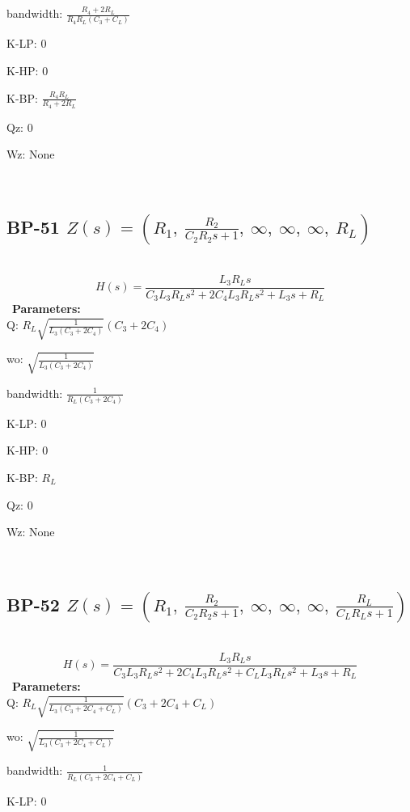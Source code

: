 \documentclass{article}
\begin{document}
bandwidth: $\frac{R_{4} + 2 R_{L}}{R_{4} R_{L} \left(C_{3} + C_{L}\right)}$\ 

K-LP: $0$\ 

K-HP: $0$\ 

K-BP: $\frac{R_{4} R_{L}}{R_{4} + 2 R_{L}}$\ 

Qz: $0$\ 

Wz: $\text{None}$\ 

\ 

\subsection{BP-51 $Z(s) = \left( R_{1}, \  \frac{R_{2}}{C_{2} R_{2} s + 1}, \  \infty, \  \infty, \  \infty, \  R_{L}\right)$ } \ 
\textbf{\[H(s) = \frac{L_{3} R_{L} s}{C_{3} L_{3} R_{L} s^{2} + 2 C_{4} L_{3} R_{L} s^{2} + L_{3} s + R_{L}}\] } \ 
\textbf{Parameters:}\\ 

Q: $R_{L} \sqrt{\frac{1}{L_{3} \left(C_{3} + 2 C_{4}\right)}} \left(C_{3} + 2 C_{4}\right)$\ 

wo: $\sqrt{\frac{1}{L_{3} \left(C_{3} + 2 C_{4}\right)}}$\ 

bandwidth: $\frac{1}{R_{L} \left(C_{3} + 2 C_{4}\right)}$\ 

K-LP: $0$\ 

K-HP: $0$\ 

K-BP: $R_{L}$\ 

Qz: $0$\ 

Wz: $\text{None}$\ 

\ 

\subsection{BP-52 $Z(s) = \left( R_{1}, \  \frac{R_{2}}{C_{2} R_{2} s + 1}, \  \infty, \  \infty, \  \infty, \  \frac{R_{L}}{C_{L} R_{L} s + 1}\right)$ } \ 
\textbf{\[H(s) = \frac{L_{3} R_{L} s}{C_{3} L_{3} R_{L} s^{2} + 2 C_{4} L_{3} R_{L} s^{2} + C_{L} L_{3} R_{L} s^{2} + L_{3} s + R_{L}}\] } \ 
\textbf{Parameters:}\\ 

Q: $R_{L} \sqrt{\frac{1}{L_{3} \left(C_{3} + 2 C_{4} + C_{L}\right)}} \left(C_{3} + 2 C_{4} + C_{L}\right)$\ 

wo: $\sqrt{\frac{1}{L_{3} \left(C_{3} + 2 C_{4} + C_{L}\right)}}$\ 

bandwidth: $\frac{1}{R_{L} \left(C_{3} + 2 C_{4} + C_{L}\right)}$\ 

K-LP: $0$\ 
\end{document}
